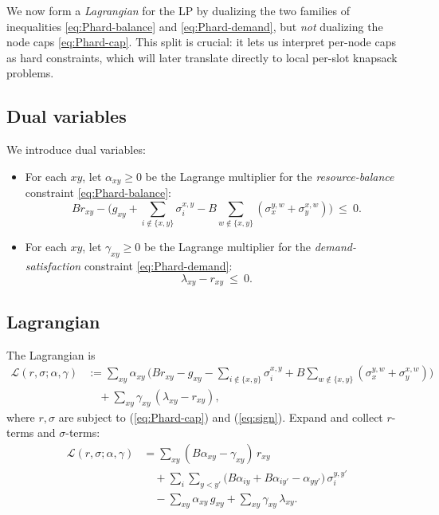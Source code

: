\documentclass[11pt]{article}
\begin{document}
We now form a \emph{Lagrangian} for the LP by dualizing the two families of inequalities \eqref{eq:Phard-balance} and \eqref{eq:Phard-demand}, but \emph{not} dualizing the node caps \eqref{eq:Phard-cap}. This split is crucial: it lets us interpret per-node caps as hard constraints, which will later translate directly to local per-slot knapsack problems.

\subsection{Dual variables}

We introduce dual variables:
\begin{itemize}[leftmargin=2em]
\item For each $xy$, let $\alpha_{xy}\ge 0$ be the Lagrange multiplier for the \emph{resource-balance} constraint \eqref{eq:Phard-balance}:
\[
B r_{xy}
-
\Big(
g_{xy}
+\sum_{i\notin\{x,y\}}\sigma_i^{x,y}
- B\sum_{w\notin\{x,y\}}(\sigma_x^{y,w}+\sigma_y^{x,w})
\Big)
\ \le\ 0.
\]

\item For each $xy$, let $\gamma_{xy}\ge 0$ be the Lagrange multiplier for the \emph{demand-satisfaction} constraint \eqref{eq:Phard-demand}:
\[
\lambda_{xy}-r_{xy} \ \le\ 0.
\]
\end{itemize}

\subsection{Lagrangian}

The  Lagrangian is
\begin{equation}
\begin{aligned}
\mathcal{L}(r,\sigma;\alpha,\gamma)
&:= \sum_{xy}\alpha_{xy}\,
\Big(
B r_{xy}
-
g_{xy}
-\sum_{i\notin\{x,y\}}\sigma_i^{x,y}
+ B\sum_{w\notin\{x,y\}}(\sigma_x^{y,w}+\sigma_y^{x,w})
\Big) \\
&\quad
+ \sum_{xy}\gamma_{xy}\,(\lambda_{xy}-r_{xy}),
\end{aligned}
\label{eq:Lagrangian-expand}
\end{equation}
where $r, \sigma$ are subject to (\ref{eq:Phard-cap}) and (\ref{eq:sign}). Expand and collect $r$-terms and $\sigma$-terms:
\begin{equation}
\begin{aligned}
\mathcal{L}(r,\sigma;\alpha,\gamma)
&= \sum_{xy}(B\alpha_{xy}-\gamma_{xy})\,r_{xy} \\
&\quad
+ \sum_i \sum_{y<y'} 
\Big(
B\alpha_{iy}+B\alpha_{iy'}
-\alpha_{yy'}
\Big)\,
\sigma_i^{y,y'} \\
&\quad
-\sum_{xy} \alpha_{xy}\,g_{xy}
+ \sum_{xy}\gamma_{xy}\,\lambda_{xy}.
\end{aligned}
\label{eq:Lagrangian-collected}
\end{equation}
\end{document}
